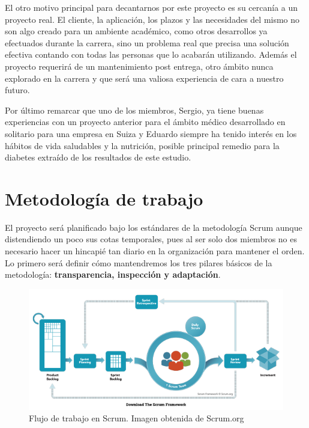 	El otro motivo principal para decantarnos por este proyecto es su cercanía a un proyecto real. El cliente, la aplicación, los plazos y las necesidades del mismo no son algo creado para un ambiente académico, como otros desarrollos ya efectuados durante la carrera, sino un problema real que precisa una solución efectiva contando con todas las personas que lo acabarán utilizando. Además el proyecto requerirá de un mantenimiento post entrega, otro ámbito nunca explorado en la carrera y que será una valiosa experiencia de cara a nuestro futuro.\newline

	Por último remarcar que uno de los miembros, Sergio, ya tiene buenas experiencias con un proyecto anterior para el ámbito médico desarrollado en solitario para una empresa en Suiza y Eduardo siempre ha tenido interés en los hábitos de vida saludables y la nutrición, posible principal remedio para la diabetes extraído de los resultados de este estudio.\newpage
	
	\section{Metodología de trabajo}
    
    El proyecto será planificado bajo los estándares de la metodología Scrum\cite{Scrum} aunque distendiendo un poco sus cotas temporales, pues al ser solo dos miembros no es necesario hacer un hincapié tan diario en la organización para mantener el orden. Lo primero será definir cómo mantendremos los tres pilares básicos de la metodología: \textbf{transparencia, inspección y adaptación}.
    
    \begin{figure}[h]
    \centering
     \includegraphics[width=1\textwidth]{images/Scrum.png}
    \caption{Flujo de trabajo en Scrum. Imagen obtenida de Scrum.org \cite{Scrum.org}}
    \end{figure}
    
